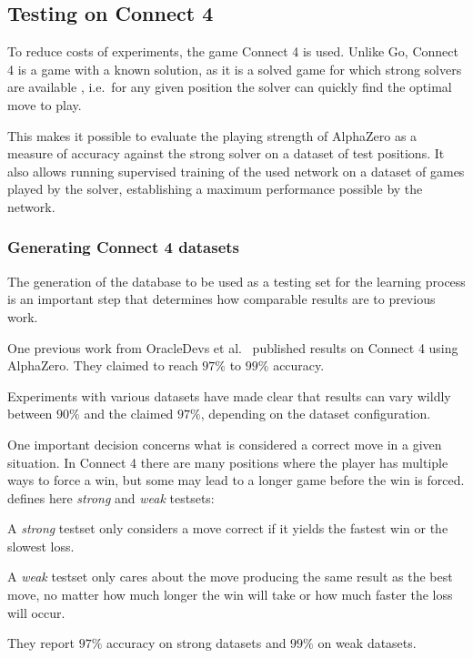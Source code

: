 \documentclass[12pt,onecolumn,oneside,titlepage]{article}
\begin{document}
\subsection{Testing on Connect 4}

To reduce costs of experiments, the game Connect 4 is used. Unlike Go, Connect 4 is a game with a known solution, as it is a solved game for which strong solvers are available \cite{trompsolved, pascalsolver, pascalsolvergithub}, 
i.e.\ for any given position the solver can quickly find the optimal move to play.

This makes it possible to evaluate the playing strength of AlphaZero as a measure of accuracy against the strong solver on a dataset of test positions.
It also allows running supervised training of the used network on a dataset of games played by the solver, establishing a maximum performance possible by the network.

\subsubsection{Generating Connect 4 datasets}
\label{s:generate_dataset}

The generation of the database to be used as a testing set for the learning process is an important step that determines how comparable results are to previous work. 

One previous work from OracleDevs et al.\ \cite{oracledevs} published results on Connect 4 using AlphaZero. They claimed to reach $97\%$ to $99\%$ accuracy.

Experiments with various datasets have made clear that results can vary wildly between $90\%$ and the claimed $97\%$, depending on the dataset configuration.

One important decision concerns what is considered a correct move in a given situation. In Connect 4 there are many positions where the player has multiple ways to force a win, but some may lead to a longer game before the win is forced.
\cite{oracledevs} defines here \emph{strong} and \emph{weak} testsets: 

A \emph{strong} testset only considers a move correct if it yields the fastest win or the slowest loss. 

A \emph{weak} testset only cares about the move producing the same result 
as the best move, no matter how much longer the win will take or how much faster the loss will occur.

They report $97\%$ accuracy on strong datasets and $99\%$ on weak datasets.
\end{document}
